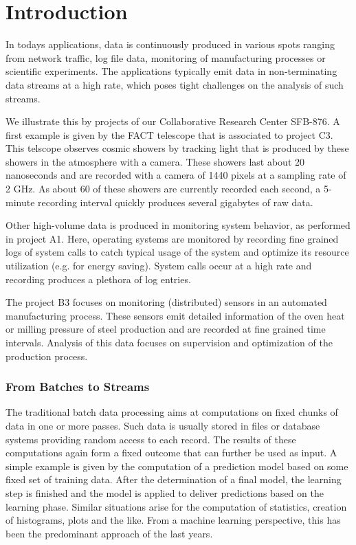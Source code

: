 \section{\label{sec:intro}Introduction}
In todays applications, data is continuously produced in various spots
ranging from network traffic, log file data, monitoring of
manufacturing processes or scientific experiments. The applications
typically emit data in non-terminating data streams at a high rate,
which poses tight challenges on the analysis of such streams.

We illustrate this by projects of our Collaborative Research Center
SFB-876. A first example is given by the FACT telescope that is
associated to project C3. This telscope observes cosmic showers by
tracking light that is produced by these showers in the atmosphere
with a camera.  These showers last about 20 nanoseconds and are
recorded with a camera of 1440 pixels at a sampling rate of 2 GHz. As
about 60 of these showers are currently recorded each second, a
5-minute recording interval quickly produces several gigabytes of raw
data.

Other high-volume data is produced in monitoring system behavior, as
performed in project A1. Here, operating systems are monitored by
recording fine grained logs of system calls to catch typical usage of
the system and optimize its resource utilization (e.g. for energy
saving). System calls occur at a high rate and recording produces a
plethora of log entries.

The project B3 focuses on monitoring (distributed) sensors in an
automated manufacturing process. These sensors emit detailed
information of the oven heat or milling pressure of steel production
and are recorded at fine grained time intervals. Analysis of this data
focuses on supervision and optimization of the production process.

\subsubsection*{From Batches to Streams}
The traditional batch data processing aims at computations on fixed
chunks of data in one or more passes. Such data is usually stored in
files or database systems providing random access to each record. The
results of these computations again form a fixed outcome that can
further be used as input. A simple example is given by the computation
of a prediction model based on some fixed set of training data. After
the determination of a final model, the learning step is finished and
the model is applied to deliver predictions based on the learning
phase. Similar situations arise for the computation of statistics,
creation of histograms, plots and the like. From a machine learning
perspective, this has been the predominant approach of the last years.

